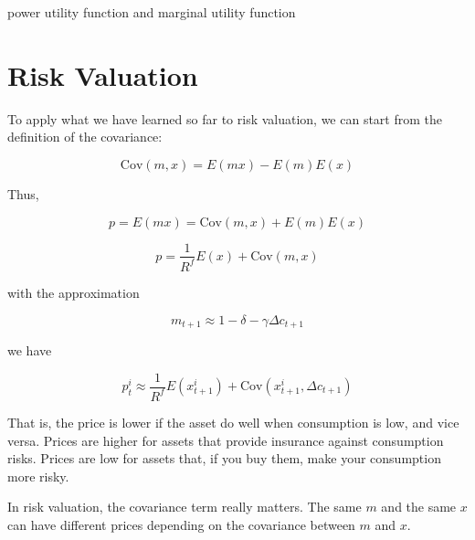\begin{tcolorbox}[colback=white, colframe=black, title=Example X]
    power utility function and marginal utility function
\end{tcolorbox}

\section{Risk Valuation}

To apply what we have learned so far to risk valuation, we can start
from the definition of the covariance:

\begin{equation}
    \text{Cov}(m, x) = E(mx) - E(m)E(x)
\end{equation}

Thus,

\begin{equation}
    p = E(mx) = \text{Cov}(m, x) + E(m)E(x)
\end{equation}

\begin{equation}
    p = \frac{1}{R^f} E(x) + \text{Cov}(m, x)
\end{equation}

with the approximation

\begin{equation}
    m_{t+1} \approx 1 - \delta - \gamma \Delta c_{t+1}
\end{equation}

we have

\begin{equation}
p^i_t \approx \frac{1}{R^f} E(x^i_{t+1}) + \text{Cov}(x^i_{t+1}, \Delta c_{t+1})
\end{equation}

That is, the price is lower if the asset do well 
when consumption is low, and vice versa. Prices are higher 
for assets that provide insurance against consumption risks.
Prices are low for assets that, if you buy them, make your consumption
more risky. 

In risk valuation, the covariance term really matters. 
The same $m$ and the same $x$ can have different prices depending on the covariance between
$m$ and $x$. 

